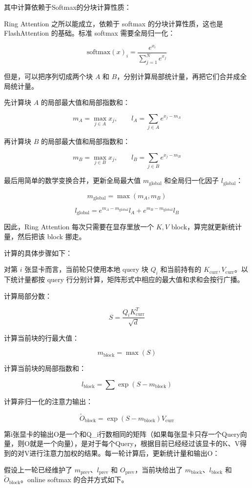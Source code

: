 其中计算依赖于Softmax的分块计算性质：

Ring Attention 之所以能成立，依赖于 softmax 的分块计算性质，这也是 FlashAttention 的基础。标准 softmax 需要全局归一化：

\[
\mathrm{softmax}(x)_i = \frac{e^{x_i}}{\sum_{j=1}^{N} e^{x_j}}
\]

但是，可以把序列切成两个块 \(A\) 和 \(B\)，分别计算局部统计量，再把它们合并成全局统计量。

先计算块 \(A\) 的局部最大值和局部指数和：

\[
m_A = \max_{j \in A} x_j,\qquad
l_A = \sum_{j \in A} e^{x_j - m_A}
\]

再计算块 \(B\) 的局部最大值和局部指数和：

\[
m_B = \max_{j \in B} x_j,\qquad
l_B = \sum_{j \in B} e^{x_j - m_B}
\]

最后用简单的数学变换合并，更新全局最大值 \(m_{\mathrm{global}}\) 和全局归一化因子 \(l_{\mathrm{global}}\)：

\[
m_{\mathrm{global}} = \max(m_A, m_B)
\]

\[
l_{\mathrm{global}} =
e^{m_A - m_{\mathrm{global}}} l_A
+ e^{m_B - m_{\mathrm{global}}} l_B
\]

因此，Ring Attention 每次只需要在显存里放一个 \(K, V\) block，算完就更新统计量，然后把该 block 挪走。

计算的具体步骤如下：

对第 \(i\) 张显卡而言，当前轮只使用本地 query 块 \(Q_i\) 和当前持有的 \(K_{\mathrm{curr}}, V_{\mathrm{curr}}\)。以下统计量都按 query 行分别计算，矩阵形式中相应的最大值和求和会按行广播。

计算局部分数：

\[
S = \frac{Q_i K_{\mathrm{curr}}^T}{\sqrt{d}}
\]

计算当前块的行最大值：

\[
m_{\mathrm{block}} = \max(S)
\]

计算当前块的局部指数和：

\[
l_{\mathrm{block}} = \sum \exp(S - m_{\mathrm{block}})
\]

计算非归一化的注意力输出：

\[
\tilde O_{\mathrm{block}} = \exp(S - m_{\mathrm{block}}) V_{\mathrm{curr}}
\]

第i张显卡的输出O是一个和Q\_i行数相同的矩阵（如果每张显卡只存一个Query向量，则O就是一个向量），是对于每个Query，根据目前已经经过该显卡的K、V得到的对V进行注意力加权的结果。每一轮计算后，更新统计量和输出O：

假设上一轮已经维护了 \(m_{\mathrm{prev}}\)、\(l_{\mathrm{prev}}\) 和 \(O_{\mathrm{prev}}\)，当前块给出了 \(m_{\mathrm{block}}\)、\(l_{\mathrm{block}}\) 和 \(\tilde O_{\mathrm{block}}\)。online softmax 的合并方式如下。

